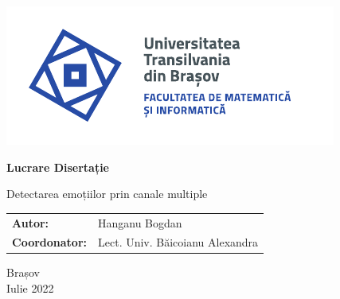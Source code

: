 \begin{titlepage}
	
	\vspace*{-3cm}
	\hspace{-2cm}
	\includegraphics[width=0.8\linewidth]{./images/Logo-UT-MI-SPOT-RO}
	
	\begin{center}
		\Huge
		
		\vspace{2cm}
		
		\textbf{Lucrare Disertație}
		
		\vspace{1cm} 
		
		\LARGE Detectarea emoțiilor prin canale multiple
		
		\vfill
		
		\Large
		\begin{tabular}{ll}
			\textbf{Autor:}&Hanganu Bogdan\\
			\textbf{Coordonator:}&Lect. Univ. Băicoianu Alexandra
		\end{tabular}
		
		\vfill
		
		\Large
		Brașov\\
		Iulie 2022
		
	\end{center}
\end{titlepage}